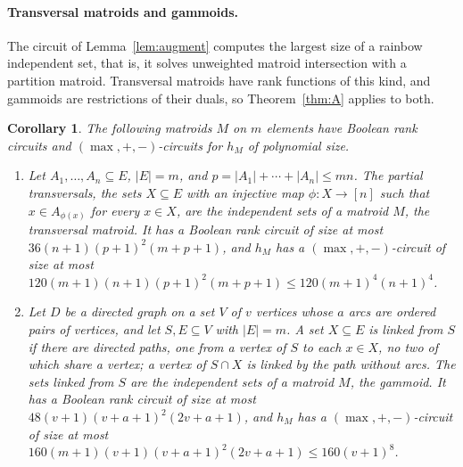 \documentclass[11pt]{article}
\newtheorem{corollary}[theorem]{Corollary}
\begin{document}
\paragraph{Transversal matroids and gammoids.}
The circuit of Lemma~\ref{lem:augment} computes the largest size of a rainbow
independent set, that is, it solves unweighted matroid intersection with a
partition matroid.  Transversal matroids have rank functions of this kind, and
gammoids are restrictions of their duals, so Theorem~\ref{thm:A} applies to
both.

\begin{corollary}
\label{cor:transversal}
The following matroids $M$ on $m$ elements have Boolean rank circuits and $(\max,+,-)$-circuits for $h_M$ of polynomial size.
\begin{enumerate}
  \item Let $A_1,\ldots,A_n\subseteq E$, $|E|=m$, and $p=|A_1|+\cdots+|A_n|\le mn$.
        The partial transversals, the sets $X\subseteq E$ with an injective map
        $\phi:X\to[n]$ such that $x\in A_{\phi(x)}$ for every $x\in X$, are the
        independent sets of a matroid $M$, the transversal matroid.  It has a
        Boolean rank circuit of size at most $36(n+1)(p+1)^{2}(m+p+1)$, and $h_M$
        has a $(\max,+,-)$-circuit of size at most
        $120(m+1)(n+1)(p+1)^{2}(m+p+1)\le120(m+1)^{4}(n+1)^{4}$.
  \item Let $D$ be a directed graph on a set $V$ of $v$ vertices whose $a$ arcs are
        ordered pairs of vertices, and let $S,E\subseteq V$ with $|E|=m$.  A set
        $X\subseteq E$ is \emph{linked} from $S$ if there are directed paths, one
        from a vertex of $S$ to each $x\in X$, no two of which share a vertex; a
        vertex of $S\cap X$ is linked by the path without arcs.  The sets linked
        from $S$ are the independent sets of a matroid $M$, the gammoid.  It has a
        Boolean rank circuit of size at most $48(v+1)(v+a+1)^{2}(2v+a+1)$, and
        $h_M$ has a $(\max,+,-)$-circuit of size at most
        $160(m+1)(v+1)(v+a+1)^{2}(2v+a+1)\le160(v+1)^{8}$.
\end{enumerate}
\end{corollary}
\end{document}
